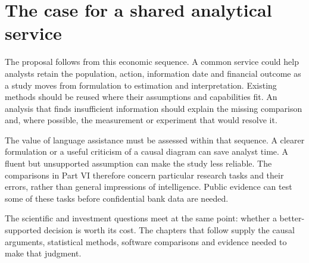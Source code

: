 \section{The case for a shared analytical service}

The proposal follows from this economic sequence. A common service could help
analysts retain the population, action, information date and financial outcome
as a study moves from formulation to estimation and interpretation. Existing
methods should be reused where their assumptions and capabilities fit. An
analysis that finds insufficient information should explain the missing
comparison and, where possible, the measurement or experiment that would
resolve it.

The value of language assistance must be assessed within that sequence. A
clearer formulation or a useful criticism of a causal diagram can save analyst
time. A fluent but unsupported assumption can make the study less reliable.
The comparisons in Part VI therefore concern particular research tasks and
their errors, rather than general impressions of intelligence. Public evidence
can test some of these tasks before confidential bank data are needed.

The scientific and investment questions meet at the same point: whether a
better-supported decision is worth its cost. The chapters that follow supply
the causal arguments, statistical methods, software comparisons and evidence
needed to make that judgment.
